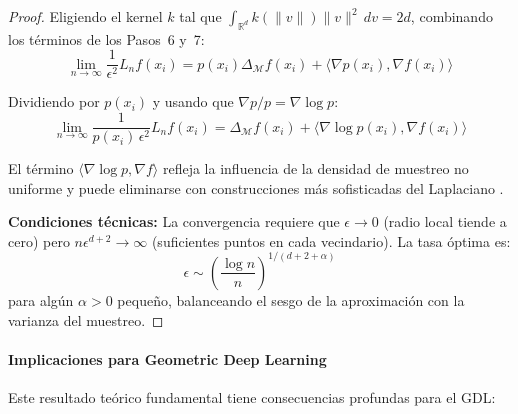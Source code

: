 \begin{proof}
	Eligiendo el kernel $k$ tal que $\int_{\mathbb{R}^d} k(\|v\|) \|v\|^2 \, dv = 2d$, combinando los términos de los Pasos~6 y~7:
	\[
		\lim_{n \to \infty} \frac{1}{\epsilon^2} L_n f(x_i) = p(x_i) \Delta_\mathcal{M} f(x_i) + \langle \nabla p(x_i), \nabla f(x_i) \rangle
	\]

	Dividiendo por $p(x_i)$ y usando que $\nabla p / p = \nabla \log p$:
	\[
		\lim_{n \to \infty} \frac{1}{p(x_i)\,\epsilon^2} L_n f(x_i) = \Delta_\mathcal{M} f(x_i) + \langle \nabla \log p(x_i), \nabla f(x_i) \rangle
	\]

	El término $\langle \nabla \log p, \nabla f \rangle$ refleja la influencia de la densidad de muestreo no uniforme y puede eliminarse con construcciones más sofisticadas del Laplaciano \citep{coifman2006diffusion, hein2007graph}.

	\textbf{Condiciones técnicas:} La convergencia requiere que $\epsilon \to 0$ (radio local tiende a cero) pero $n\epsilon^{d+2} \to \infty$ (suficientes puntos en cada vecindario). La tasa óptima es:
	\[
		\epsilon \sim \left(\frac{\log n}{n}\right)^{1/(d+2+\alpha)}
	\]
	para algún $\alpha > 0$ pequeño, balanceando el sesgo de la aproximación con la varianza del muestreo.
\end{proof}

\paragraph{Implicaciones para Geometric Deep Learning}

Este resultado teórico fundamental tiene consecuencias profundas para el \gls{GDL}:

